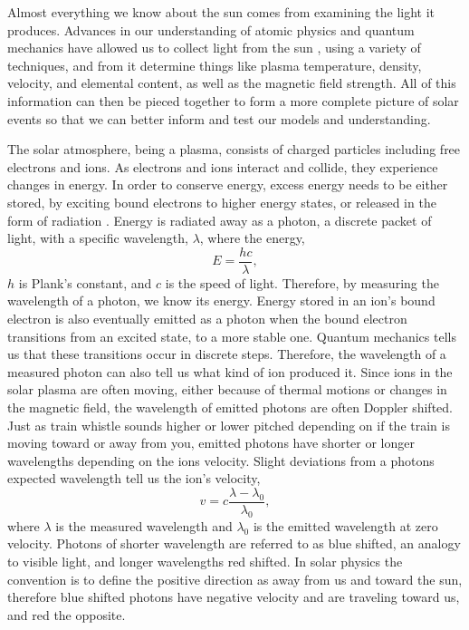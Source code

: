 Almost everything we know about the sun comes from examining the light it produces. 
Advances in our understanding of atomic physics and quantum mechanics have allowed us to collect light from the sun , using a variety of techniques, and from it determine things like plasma temperature, density, velocity, and elemental content, as well as the magnetic field strength.
All of this information can then be pieced together to form a more complete picture of solar events so that we can better inform and test our models and understanding.

The solar atmosphere, being a plasma, consists of charged particles including free electrons and ions.
As electrons and ions interact and collide, they experience changes in energy. 
In order to conserve energy, excess energy needs to be either stored, by exciting bound electrons to higher energy states, or released in the form of radiation .
Energy is radiated away as a photon, a discrete packet of light, with a specific wavelength, $\lambda$, where the energy,
\begin{equation}
	E = \frac{hc}{\lambda},
\end{equation}
$h$ is Plank's constant, and $c$ is the speed of light.
Therefore, by measuring the wavelength of a photon, we know its energy.
Energy stored in an ion's bound electron is also eventually emitted as a photon when the bound electron transitions from an excited state, to a more stable one.
Quantum mechanics tells us that these transitions occur in discrete steps.
Therefore,  the wavelength of a measured photon can also tell us what kind of ion produced it.
Since ions in the solar plasma are often moving, either because of thermal motions or changes in the magnetic field, the wavelength of emitted photons are often Doppler shifted.  
Just as train whistle sounds higher or lower pitched depending on if the train is moving toward or away from you, emitted photons have shorter or longer wavelengths depending on the ions velocity.
Slight deviations from a photons expected wavelength tell us the ion's velocity,
\begin{equation}
	v = c \frac{\lambda - \lambda_0}{\lambda_0},
\end{equation}
where $\lambda$ is the measured wavelength and $\lambda_0$ is the emitted wavelength at zero velocity.
Photons of shorter wavelength are referred to as blue shifted, an analogy to visible light, and longer wavelengths red shifted.
In solar physics the convention is to define the positive direction as away from us and toward the sun, therefore blue shifted photons have negative velocity and are traveling toward us, and red the opposite.

